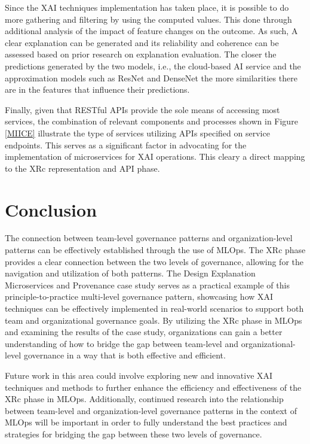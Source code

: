 \documentclass[conference]{IEEEtran}
\begin{document}
Since the XAI techniques implementation has taken place, it is possible to do more gathering and filtering by using the computed values. This done through additional analysis of the impact of feature changes on the outcome. As such, A clear explanation can be generated and its reliability and coherence can be assessed based on prior research on explanation evaluation. The closer the predictions generated by the two models, i.e., the cloud-based AI service and the approximation models such as ResNet and DenseNet the more similarities there are in the features that influence their predictions.

Finally, given that RESTful APIs provide the sole means of accessing most services, the combination of relevant components and processes shown in Figure \ref{MIICE} illustrate the type of services utilizing APIs specified on service endpoints. This serves as a significant factor in advocating for the implementation of microservices for XAI operations. This cleary a direct mapping to the XRc representation and API phase.

\section{Conclusion}
The connection between team-level governance patterns and organization-level patterns can be effectively established through the use of MLOps. The XRc phase provides a clear connection between the two levels of governance, allowing for the navigation and utilization of both patterns. The Design Explanation Microservices and Provenance case study serves as a practical example of this principle-to-practice multi-level governance pattern, showcasing how XAI techniques can be effectively implemented in real-world scenarios to support both team and organizational governance goals. By utilizing the XRc phase in MLOps and examining the results of the case study, organizations can gain a better understanding of how to bridge the gap between team-level and organizational-level governance in a way that is both effective and efficient.

Future work in this area could involve exploring new and innovative XAI techniques and methods to further enhance the efficiency and effectiveness of the XRc phase in MLOps. Additionally, continued research into the relationship between team-level and organization-level governance patterns in the context of MLOps will be important in order to fully understand the best practices and strategies for bridging the gap between these two levels of governance.



\end{document}
